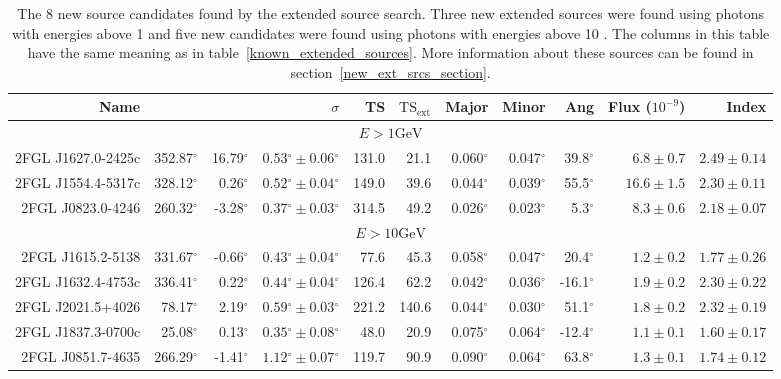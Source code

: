 \documentclass[12pt,preprint]{aastex}
\newcommand{\gev}{\text{GeV}\xspace}
\newcommand{\tsext}{{\ensuremath{\text{TS}_\text{ext}}}\xspace}
\newcommand{\glon}{\text{GLON}\xspace}
\newcommand{\glat}{\text{GLAT}\xspace}
\renewcommand{\deg}{\ensuremath{^\circ}\xspace}
\begin{document}
\clearpage
\begin{table}
  \begin{centering}
    \begin{tabular}{r|rrrrrrrrrr}
      \hline
      \hline
      Name                 &          \glon &          \glat &                    $\sigma$ &         TS &   $\tsext$ &      Major &      Minor &        Ang &      Flux ($10^{-9}$) &                 Index \\
      \hline
      \multicolumn{11}{c}{$E > 1\gev$} \\
      \hline
      2FGL J1627.0-2425c   &     352.87\deg &      16.79\deg & $  0.53\deg \pm   0.06\deg$ &      131.0 &       21.1 &  0.060\deg &  0.047\deg &   39.8\deg & $    6.8 \pm     0.7$ & $   2.49 \pm    0.14$ \\
      2FGL J1554.4-5317c   &     328.12\deg &       0.26\deg & $  0.52\deg \pm   0.04\deg$ &      149.0 &       39.6 &  0.044\deg &  0.039\deg &   55.5\deg & $   16.6 \pm     1.5$ & $   2.30 \pm    0.11$ \\
      2FGL J0823.0-4246    &     260.32\deg &      -3.28\deg & $  0.37\deg \pm   0.03\deg$ &      314.5 &       49.2 &  0.026\deg &  0.023\deg &    5.3\deg & $    8.3 \pm     0.6$ & $   2.18 \pm    0.07$ \\
      \hline
      \multicolumn{11}{c}{$E > 10\gev$} \\
      \hline
      2FGL J1615.2-5138    &     331.67\deg &      -0.66\deg & $  0.43\deg \pm   0.04\deg$ &       77.6 &       45.3 &  0.058\deg &  0.047\deg &   20.4\deg & $    1.2 \pm     0.2$ & $   1.77 \pm    0.26$ \\
      2FGL J1632.4-4753c   &     336.41\deg &       0.22\deg & $  0.44\deg \pm   0.04\deg$ &      126.4 &       62.2 &  0.042\deg &  0.036\deg &  -16.1\deg & $    1.9 \pm     0.2$ & $   2.30 \pm    0.22$ \\
      2FGL J2021.5+4026    &      78.17\deg &       2.19\deg & $  0.59\deg \pm   0.03\deg$ &      221.2 &      140.6 &  0.044\deg &  0.030\deg &   51.1\deg & $    1.8 \pm     0.2$ & $   2.32 \pm    0.19$ \\
      2FGL J1837.3-0700c   &      25.08\deg &       0.13\deg & $  0.35\deg \pm   0.08\deg$ &       48.0 &       20.9 &  0.075\deg &  0.064\deg &  -12.4\deg & $    1.1 \pm     0.1$ & $   1.60 \pm    0.17$ \\
      2FGL J0851.7-4635    &     266.29\deg &      -1.41\deg & $  1.12\deg \pm   0.07\deg$ &      119.7 &       90.9 &  0.090\deg &  0.064\deg &   63.8\deg & $    1.3 \pm     0.1$ & $   1.74 \pm    0.12$ \\
      \hline
    \end{tabular}
    \caption{The 8 new source candidates found by the extended source
    search. Three new extended sources were found using photons with
    energies above 1 \gev and five new candidates were found using photons
    with energies above 10 \gev.  The columns in this table have the same
    meaning as in table~\ref{known_extended_sources}.  More information
    about these sources can be found in section~\ref{new_ext_srcs_section}.
    }
    \label{new_ext_srcs_table}
  \end{centering}
\end{table}
\end{document}
